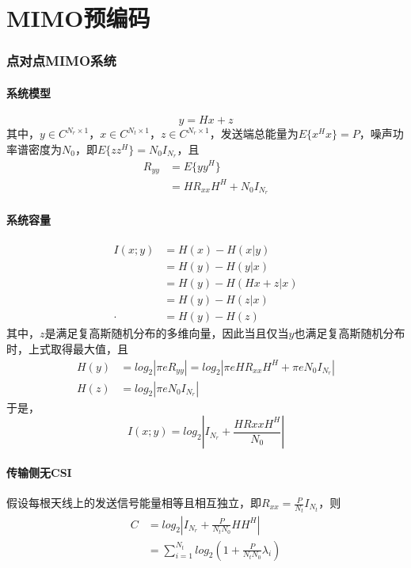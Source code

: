 \part{MIMO预编码}
\section{点对点MIMO系统}
\subsection{系统模型}
\begin{equation}
    y=Hx+z
\end{equation}
其中，$y\in C^{N_r\times1}$，$x\in C^{N_t\times 1}$，$z\in C^{N_r\times1}$，发送端总能量为$E\{x^Hx\}=P$，噪声功率谱密度为$N_0$，即$E\{zz^H\}=N_0I_{N_r}$，且
\begin{equation}
    \begin{aligned}
        R_{yy}&=E\{yy^H\} \\
        &=HR_{xx}H^H+N_0I_{N_r}
    \end{aligned}
\end{equation}

\subsection{系统容量}
\begin{equation}
    \begin{aligned}
        I(x;y)&=H(x)-H(x|y)\\
        &=H(y)-H(y|x) \\
        &=H(y)-H(Hx+z|x) \\
        &=H(y)-H(z|x) \\·
        &=H(y)-H(z)
    \end{aligned}
\end{equation}
其中，$z$是满足复高斯随机分布的多维向量，因此当且仅当$y$也满足复高斯随机分布时，上式取得最大值，且
\begin{equation}
\begin{aligned}
    H(y)&=log_2|\pi eR_{yy}| =log_2|\pi eHR_{xx}H^H+\pi eN_0I_{N_r}| \\
    H(z)&=log_2|\pi e N_0I_{N_r}|
\end{aligned}
\end{equation}
于是，
\begin{equation}
    I(x;y)=log_2\left|I_{N_r} + \frac{HR{xx}H^H}{N_0}\right|
\end{equation}

\subsection{传输侧无CSI}
假设每根天线上的发送信号能量相等且相互独立，即$R_{xx}=\frac{P}{N_t}I_{N_t}$，则
\begin{equation}
    \begin{aligned}
    C&=log_2\left|I_{N_r} + \frac{P}{N_tN_0}HH^H\right| \\
    &=\sum_{i=1}^{N_t}log_2(1+\frac{P}{N_tN_0}\lambda_i)
    \end{aligned}
\end{equation}

